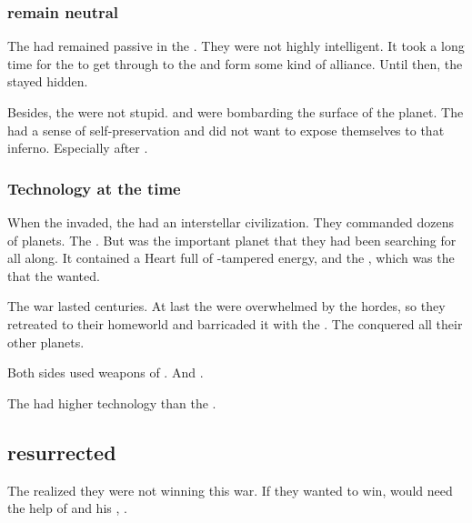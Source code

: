 \subsubsection{\Noggyaleth remain neutral}
The \noggyaleth had remained passive in the \firstbanewar. 
They were not highly intelligent. 
It took a long time for the \banes to get through to the \noggyaleth and form some kind of alliance. 
Until then, the \noggyaleth stayed hidden. 

Besides, the \noggyaleth were not stupid.
\Banes and \ophidians were bombarding the surface of the planet.
The \noggyaleth had a sense of self-preservation and did not want to expose themselves to that inferno.
Especially after . 






\subsubsection{Technology at the time}
When the \banes invaded, the \ophidians had an interstellar civilization.
They commanded dozens of planets. 
The \banes {}. 
But \Miith was the important planet that they had been searching for all along. 
It contained a Heart full of \voyager-tampered energy, and the \noggyal {}, which was the  that the \banes wanted. 

The war lasted centuries. 
At last the \ophidians were overwhelmed by the \bane hordes, so they retreated to their homeworld and barricaded it with the \CrystalSphere. 
The \banes conquered all their other planets. 

Both sides used weapons of . 
And . 

The \ophidians had higher technology than the \banes. 








\subsection{\Sethicus resurrected}
The \ophidians realized they were not winning this war.
If they wanted to win, would need the help of \Sethicus and his \dragons, . 

